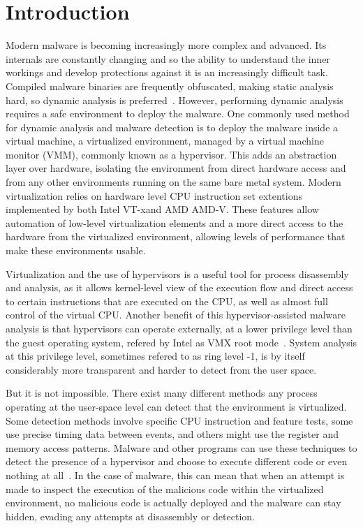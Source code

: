 \section{Introduction}\label{s:intro}

Modern malware is becoming increasingly more complex and advanced.
Its internals are constantly changing and so the ability to understand the inner workings and develop protections against it is an increasingly difficult task. 
Compiled malware binaries are frequently obfuscated, making static analysis hard, so dynamic analysis is preferred~\cite{Leon2021, 10.1145/2245276.2232070}. However, performing dynamic analysis requires a safe environment 
to deploy the malware. One commonly used method for dynamic analysis and malware detection is to deploy the malware inside a virtual machine, a virtualized environment, managed by a virtual machine monitor (VMM),
commonly known as a hypervisor. This adds an abstraction layer over hardware, isolating the environment from direct hardware access and from any other environments running on the same bare metal system. 
Modern virtualization relies on hardware level CPU instruction set extentions implemented by both Intel\textsuperscript{\tiny\textregistered} VT-x\texttrademark and AMD\textsuperscript{\tiny\textregistered} AMD-V\texttrademark. 
These features allow automation of low-level virtualization elements and a more direct access to the hardware from the virtualized environment, allowing levels of performance that make these environments usable.

Virtualization and the use of hypervisors is a useful tool for process disassembly and analysis, as it allows kernel-level view of the execution flow and direct access to certain instructions that are executed on the CPU, as well as almost full
control of the virtual CPU.
Another benefit of this hypervisor-assisted malware analysis is that hypervisors can operate externally, at a lower privilege level than the guest operating system, refered by Intel as VMX root mode~\cite{Intel-SDM2025}.
System analysis at this privilege level, sometimes refered to as ring level -1,  is by itself considerably more transparent and harder to detect from the user space.

But it is not impossible. There exist many different methods any process operating at the user-space level can detect that the environment is virtualized. 
Some detection methods involve specific CPU instruction and feature tests, some use precise timing data between events, and others might use the register and memory access patterns. 
Malware and other programs can use these techniques to detect the presence of a hypervisor and choose to execute different code or even nothing at all~\cite{10.1109/TIFS.2020.2976559}. 
In the case of malware, this can mean that when an attempt is made to inspect the execution of the malicious code within the virtualized environment, 
no malicious code is actually deployed and the malware can stay hidden, evading any attempts at disassembly or detection.

